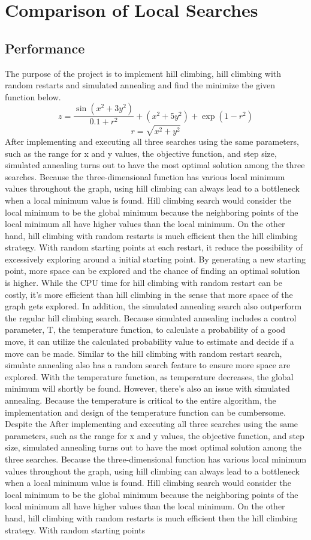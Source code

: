 \documentclass[a4paper]{article}
\begin{document}
\section{Comparison of Local Searches}
\subsection{Performance}
The purpose of the project is to implement hill climbing, hill climbing with random restarts and simulated annealing and find the minimize the given function below.
$$z = \frac{\sin(x^2 + 3y^2) }{0.1+r^2}+ (x^2+5y^2) + \exp(1-r^2)$$
      $$ r = \sqrt{x^2 + y^2}$$
After implementing and executing all three searches using the same parameters, such as the range for x and y values, the objective function, and step size, simulated annealing turns out to have the most optimal solution among the three searches. Because the three-dimensional function has various local minimum values throughout the graph, using hill climbing can always lead to a bottleneck when a local minimum value is found. Hill climbing search would consider the local minimum to be the global minimum because the neighboring points of the local minimum all have higher values than the local minimum. On the other hand, hill climbing with random restarts is much efficient then the hill climbing strategy. With random starting points at each restart, it reduce the possibility of excessively exploring around a initial starting point. By generating a new starting point, more space can be explored and the chance of finding an optimal solution is higher. While the CPU time for hill climbing with random restart can be costly, it's more efficient than hill climbing in the sense that more space of the graph gets explored. In addition, the simulated annealing search also outperform the regular hill climbing search. Because simulated annealing includes a control parameter, T, the temperature function, to calculate a probability of a good move, it can utilize the calculated probability value to estimate and decide if a move can be made. Similar to the hill climbing with random restart search, simulate annealing also has a random search feature to ensure more space are explored. With the temperature function, as temperature decreases, the global minimum will shortly be found. However, there's also an issue with simulated annealing. Because the temperature is critical to the entire algorithm, the implementation and design of the temperature function can be cumbersome. Despite the After implementing and executing all three searches using the same parameters, such as the range for x and y values, the objective function, and step size, simulated annealing turns out to have the most optimal solution among the three searches. Because the three-dimensional function has various local minimum values throughout the graph, using hill climbing can always lead to a bottleneck when a local minimum value is found. Hill climbing search would consider the local minimum to be the global minimum because the neighboring points of the local minimum all have higher values than the local minimum. On the other hand, hill climbing with random restarts is much efficient then the hill climbing strategy. With random starting points 
\end{document}
